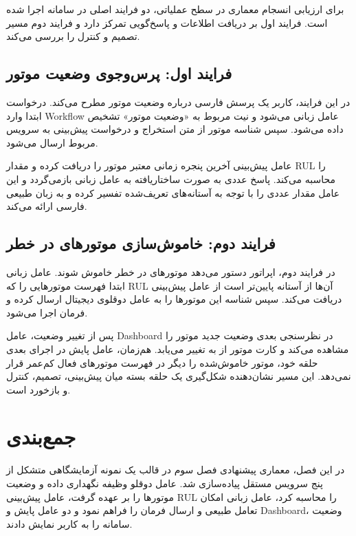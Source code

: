 \documentclass[a4paper,fleqn]{report}
\begin{document}
برای ارزیابی انسجام معماری در سطح عملیاتی، دو فرایند اصلی در سامانه اجرا شده است. فرایند اول بر دریافت اطلاعات و پاسخ‌گویی تمرکز دارد و فرایند دوم مسیر تصمیم و کنترل را بررسی می‌کند.

\subsection{فرایند اول: پرس‌وجوی وضعیت موتور}

در این فرایند، کاربر یک پرسش فارسی درباره وضعیت موتور مطرح می‌کند. درخواست ابتدا وارد \gls{Workflow} عامل زبانی می‌شود و نیت مربوط به «وضعیت موتور» تشخیص داده می‌شود. سپس شناسه موتور از متن استخراج و درخواست پیش‌بینی به سرویس مربوط ارسال می‌شود.

عامل پیش‌بینی آخرین پنجره زمانی معتبر موتور را دریافت کرده و مقدار \gls{RUL} را محاسبه می‌کند. پاسخ عددی به صورت ساختاریافته به عامل زبانی بازمی‌گردد و این عامل مقدار عددی را با توجه به آستانه‌های تعریف‌شده تفسیر کرده و به زبان طبیعی فارسی ارائه می‌کند.



\subsection{فرایند دوم: خاموش‌سازی موتورهای در خطر}

در فرایند دوم، اپراتور دستور می‌دهد موتورهای در خطر خاموش شوند. عامل زبانی ابتدا فهرست موتورهایی را که \gls{RUL} آن‌ها از آستانه پایین‌تر است از عامل پیش‌بینی دریافت می‌کند. سپس شناسه این موتورها را به عامل دوقلوی دیجیتال ارسال کرده و فرمان  اجرا می‌شود.

پس از تغییر وضعیت، عامل \gls{Dashboard} در نظرسنجی بعدی وضعیت جدید موتور را مشاهده می‌کند و کارت موتور از  به  تغییر می‌یابد. هم‌زمان، عامل پایش در اجرای بعدی حلقه خود، موتور خاموش‌شده را دیگر در فهرست موتورهای فعال کم‌عمر قرار نمی‌دهد. این مسیر نشان‌دهنده شکل‌گیری یک حلقه بسته میان پیش‌بینی، تصمیم، کنترل و بازخورد است.


\section{جمع‌بندی}
\label{sec:impl-summary}

در این فصل، معماری پیشنهادی فصل سوم در قالب یک نمونه آزمایشگاهی متشکل از پنج سرویس مستقل پیاده‌سازی شد. عامل دوقلو وظیفه نگهداری داده و وضعیت موتور‌ها را بر عهده گرفت، عامل پیش‌بینی \gls{RUL} را محاسبه کرد، عامل زبانی امکان تعامل طبیعی و ارسال فرمان را فراهم نمود و دو عامل پایش و \gls{Dashboard}، وضعیت سامانه را به کاربر نمایش دادند.
\end{document}
